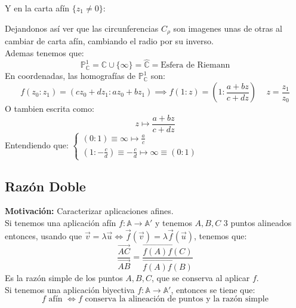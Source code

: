 Y en la carta afín $\{ z_1 \neq 0 \}$:
\begin{center}
\end{center}

Dejandonos así ver que las circunferencias $C_\rho$ son imagenes unas de otras al cambiar de carta afín, cambiando el radio por su inverso.\\

Ademas tenemos que:
\[
\mathbb{P}^1_{\mathbb{C}} =
\mathbb{C} \cup \{\infty\} =
\hat{\mathbb{C}} =
\text{Esfera de Riemann}
\]
En coordenadas, las homografías de $\mathbb{P}^1_{\mathbb{C}}$ son:
\[
f(z_0 : z_1) = (c z_0 + d z_1 : a z_0 + b z_1) \implies
f(1 : z) = (1 : \frac{a + b z}{c + d z}) \, \quad z=\frac{z_1}{z_0}
\]
O tambien escrita como:
\[
z \mapsto \frac{a + b z}{c + d z}
\]
Entendiendo que: $\begin{cases}
    (0:1) \equiv \infty \mapsto \frac{a}{c} \\
    (1:-\frac{c}{d}) \equiv -\frac{c}{d} \mapsto \infty \equiv (0:1)
\end{cases}$

\subsection{Razón Doble}

\textbf{Motivación: } Caracterizar aplicaciones afines.\\

Si tenemos una aplicación afín $f: \mathbb{A} \to \mathbb{A}'$ y tenemos $A,B,C$ 3 puntos alineados entonces, usando que $\vec{v} = \lambda \vec{u} \iff \vec{f}(\vec{v}) = \lambda \vec{f}(\vec{u})$, tenemos que:
\[
\frac{\vec{AC}}{\vec{AB}} =
\frac{\vec{f(A)f(C)}}{\vec{f(A)f(B)}}
\]
Es la razón simple de los puntos $A,B,C$, que se conserva al aplicar $f$.\\

Si tenemos una aplicación biyectiva $f: \mathbb{A} \to \mathbb{A}'$, entonces se tiene que:
\[
f \text{ afín } \iff f \text{ conserva la alineación de puntos y la razón simple}
\]

